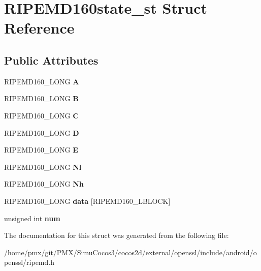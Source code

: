 \hypertarget{structRIPEMD160state__st}{}\section{R\+I\+P\+E\+M\+D160state\+\_\+st Struct Reference}
\label{structRIPEMD160state__st}
\subsection*{Public Attributes}
\begin{DoxyCompactItemize}
\item 
\mbox{\label{structRIPEMD160state__st_aff584a2fea5f0d7e0e6417ad82b2105b}} 
R\+I\+P\+E\+M\+D160\+\_\+\+L\+O\+NG {\bfseries A}
\item 
\mbox{\label{structRIPEMD160state__st_a13a7eae93311ddac26f72cdc497890c0}} 
R\+I\+P\+E\+M\+D160\+\_\+\+L\+O\+NG {\bfseries B}
\item 
\mbox{\label{structRIPEMD160state__st_ab2caeef80f014ab050d680953719d66d}} 
R\+I\+P\+E\+M\+D160\+\_\+\+L\+O\+NG {\bfseries C}
\item 
\mbox{\label{structRIPEMD160state__st_afe0e351485e4bd84951f447449743567}} 
R\+I\+P\+E\+M\+D160\+\_\+\+L\+O\+NG {\bfseries D}
\item 
\mbox{\label{structRIPEMD160state__st_a236f279b953d3527e5d7466554a7b807}} 
R\+I\+P\+E\+M\+D160\+\_\+\+L\+O\+NG {\bfseries E}
\item 
\mbox{\label{structRIPEMD160state__st_a9acc9c92383f29553b952e9eef1f637e}} 
R\+I\+P\+E\+M\+D160\+\_\+\+L\+O\+NG {\bfseries Nl}
\item 
\mbox{\label{structRIPEMD160state__st_ab2372dbb5687eeda765406bac59fab6b}} 
R\+I\+P\+E\+M\+D160\+\_\+\+L\+O\+NG {\bfseries Nh}
\item 
\mbox{\label{structRIPEMD160state__st_ae2d9f6c9ea387de5125de78b45bbba00}} 
R\+I\+P\+E\+M\+D160\+\_\+\+L\+O\+NG {\bfseries data} \mbox{[}R\+I\+P\+E\+M\+D160\+\_\+\+L\+B\+L\+O\+CK\mbox{]}
\item 
\mbox{\label{structRIPEMD160state__st_acb6e5ff004459b4b8bada376dbc87014}} 
unsigned int {\bfseries num}
\end{DoxyCompactItemize}


The documentation for this struct was generated from the following file\+:\begin{DoxyCompactItemize}
\item 
/home/pmx/git/\+P\+M\+X/\+Simu\+Cocos3/cocos2d/external/openssl/include/android/openssl/ripemd.\+h\end{DoxyCompactItemize}

